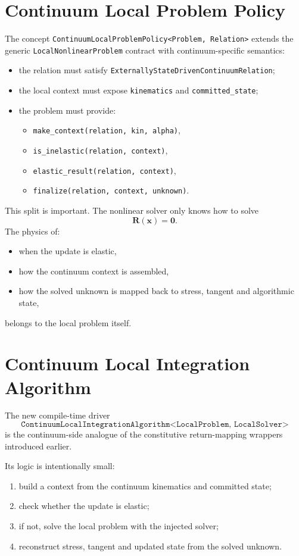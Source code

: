 \section{Continuum Local Problem Policy}

The concept
\texttt{ContinuumLocalProblemPolicy<Problem, Relation>}
extends the generic
\texttt{LocalNonlinearProblem}
contract with continuum-specific semantics:
\begin{itemize}
  \item the relation must satisfy
        \texttt{ExternallyStateDrivenContinuumRelation};
  \item the local context must expose
        \texttt{kinematics} and
        \texttt{committed\_state};
  \item the problem must provide:
        \begin{itemize}
          \item \texttt{make\_context(relation, kin, alpha)},
          \item \texttt{is\_inelastic(relation, context)},
          \item \texttt{elastic\_result(relation, context)},
          \item \texttt{finalize(relation, context, unknown)}.
        \end{itemize}
\end{itemize}

This split is important.  The nonlinear solver only knows how to solve
\[
  \mathbf{R}(\mathbf{x}) = \mathbf{0}.
\]
The physics of:
\begin{itemize}
  \item when the update is elastic,
  \item how the continuum context is assembled,
  \item how the solved unknown is mapped back to stress, tangent and
        algorithmic state,
\end{itemize}
belongs to the local problem itself.

\section{Continuum Local Integration Algorithm}

The new compile-time driver
\[
  \texttt{ContinuumLocalIntegrationAlgorithm<LocalProblem, LocalSolver>}
\]
is the continuum-side analogue of the constitutive return-mapping wrappers
introduced earlier.

Its logic is intentionally small:
\begin{enumerate}
  \item build a context from the continuum kinematics and committed state;
  \item check whether the update is elastic;
  \item if not, solve the local problem with the injected solver;
  \item reconstruct stress, tangent and updated state from the solved unknown.
\end{enumerate}

